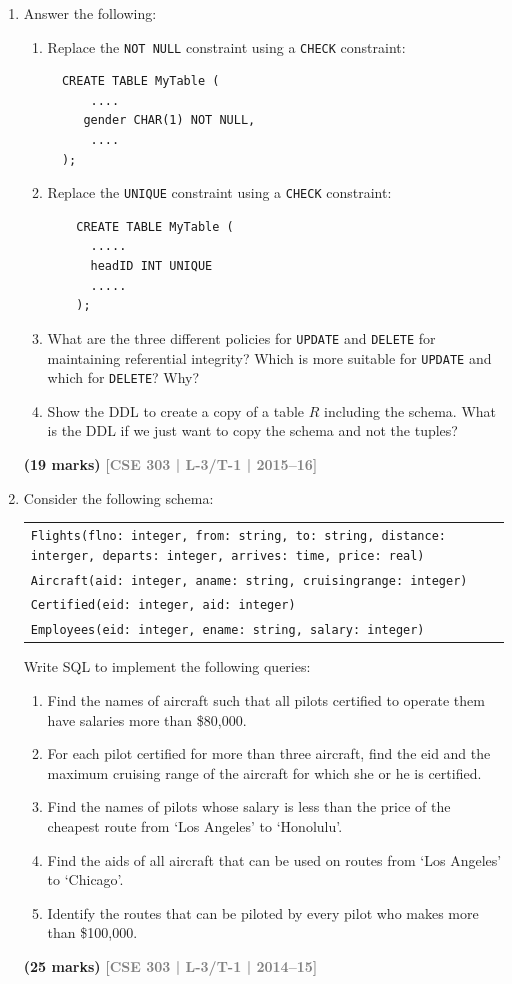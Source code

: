 \documentclass[12pt,a3paper]{article}
\newcommand{\yr}[1]{\hfill\textcolor{gray}{\small\textbf{[#1]}}}
\newcommand{\mk}[1]{\textcolor{orange!70!black}{\small\textbf{(#1 marks)}}}
\begin{document}
\begin{enumerate}
\item Answer the following:
\begin{enumerate}
  \item Replace the \texttt{NOT NULL} constraint using a \texttt{CHECK} constraint:\\
  \begin{lstlisting}
  CREATE TABLE MyTable (
      ....
     gender CHAR(1) NOT NULL,
      ....
  );
    \end{lstlisting}
  \item Replace the \texttt{UNIQUE} constraint using a \texttt{CHECK} constraint:\\ 
  \begin{lstlisting}
    CREATE TABLE MyTable (
      .....
      headID INT UNIQUE
      .....
    );
  \end{lstlisting} 
  \item What are the three different policies for \texttt{UPDATE} and \texttt{DELETE} for maintaining referential integrity? Which is more suitable for \texttt{UPDATE} and which for \texttt{DELETE}? Why?
  \item Show the DDL to create a copy of a table $R$ including the schema. What is the DDL if we just want to copy the schema and not the tuples?
\end{enumerate}
\mk{19} \yr{CSE 303 | L-3/T-1 | 2015--16}

\item Consider the following schema:
\begin{center}
\begin{tabular}{l}
\texttt{Flights(flno: integer, from: string, to: string, distance: interger, departs: integer, arrives: time, price: real)}\\
\texttt{Aircraft(aid: integer, aname: string, cruisingrange: integer)}\\
\texttt{Certified(eid: integer, aid: integer)}\\
\texttt{Employees(eid: integer, ename: string, salary: integer)}
\end{tabular}
\end{center}
Write SQL to implement the following queries:
\begin{enumerate}
  \item Find the names of aircraft such that all pilots certified to operate them have salaries more than \$80,000.
  \item For each pilot certified for more than three aircraft, find the eid and the maximum cruising range of the aircraft for which she or he is certified.
  \item Find the names of pilots whose salary is less than the price of the cheapest route from `Los Angeles' to `Honolulu'.
  \item Find the aids of all aircraft that can be used on routes from `Los Angeles' to `Chicago'.
  \item Identify the routes that can be piloted by every pilot who makes more than \$100,000.
\end{enumerate}
\mk{25} \yr{CSE 303 | L-3/T-1 | 2014--15}


\end{enumerate}
\end{document}
